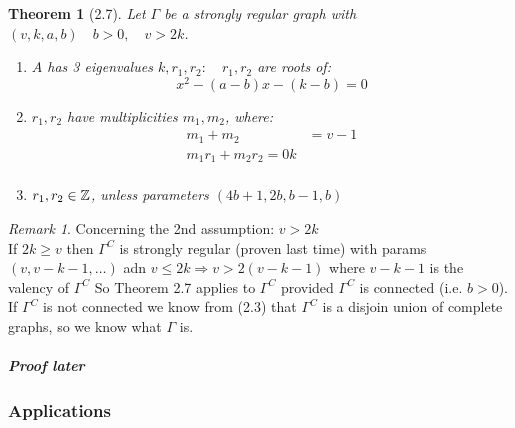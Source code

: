 \documentclass[]{article}
\newtheorem{thm}{Theorem}[section]
\theoremstyle{definition}
\theoremstyle{remark}
\newtheorem*{rem}{Remark}
\numberwithin{equation}{section}
\begin{document}
		\begin{thm}[2.7]
			Let $\Gamma$ be a strongly regular graph with $(v, k, a, b)\quad b >0,\quad v> 2k$.
			\begin{enumerate}
				\item $A$ has 3 eigenvalues $k, r_1, r_2:\quad r_1, r_2$ are roots of:
					\[x^2 - (a-b) x - (k-b) = 0\]
				\item $r_1, r_2$ have multiplicities $m_1, m_2$, where:
					\begin{align*}
						m_1 + m_2 &= v-1\\
						m_1 r_1 + m_2 r_2 = 0k\\
					\end{align*}
				\item $r_1, r_2 \in \mathbb{Z}$, unless parameters $(4b +1,2b, b-1, b)$
			\end{enumerate}
		\end{thm}
		\begin{rem}Concerning the 2nd assumption: $v > 2k$\\
			If $2k \geq v$ then $\Gamma^C$ is strongly regular (proven last time) with params $(v, v-k-1, \hdots)$ adn $v \leq 2k \Rightarrow v > 2(v-k-1)$ where $v -k-1$ is the valency of $\Gamma^C$
			So Theorem 2.7 applies to $\Gamma^C$ provided $\Gamma^C$ is connected (i.e. $b > 0$). If $\Gamma^C$ is not connected we know from (2.3) that $\Gamma^C$ is a disjoin union of complete graphs, so we know what $\Gamma$ is.
		\end{rem}

		\paragraph{\emph{Proof later}}

		\subsubsection*{Applications}
\end{document}
